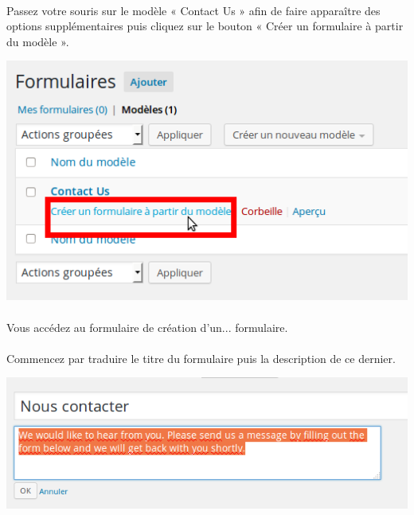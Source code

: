 \documentclass[10pt,a4paper]{article}
\begin{document}
\paragraph{}Passez votre souris sur le modèle « Contact Us » afin de faire apparaître des options supplémentaires puis cliquez sur le bouton « Créer un formulaire à partir du modèle ».
\begin{center}
\includegraphics[scale=0.3]{img/0182.png}
\end{center}
\paragraph{}Vous accédez au formulaire de création d'un... formulaire.
\paragraph{}Commencez par traduire le titre du formulaire puis la description de ce dernier.
\begin{center}
\includegraphics[scale=0.3]{img/0183.png}
\end{center}
\end{document}
